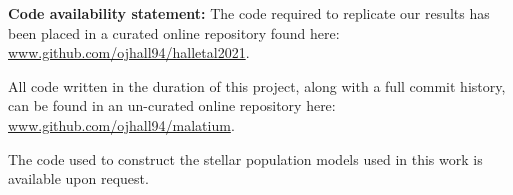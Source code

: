 \textbf{Code availability statement:} The code required to replicate our results has been placed in a curated online repository found here: \url{www.github.com/ojhall94/halletal2021}. 

All code written in the duration of this project, along with a full commit history, can be found in an un-curated online repository here: \url{www.github.com/ojhall94/malatium}. 

The code used to construct the stellar population models used in this work is available upon request.


%

%